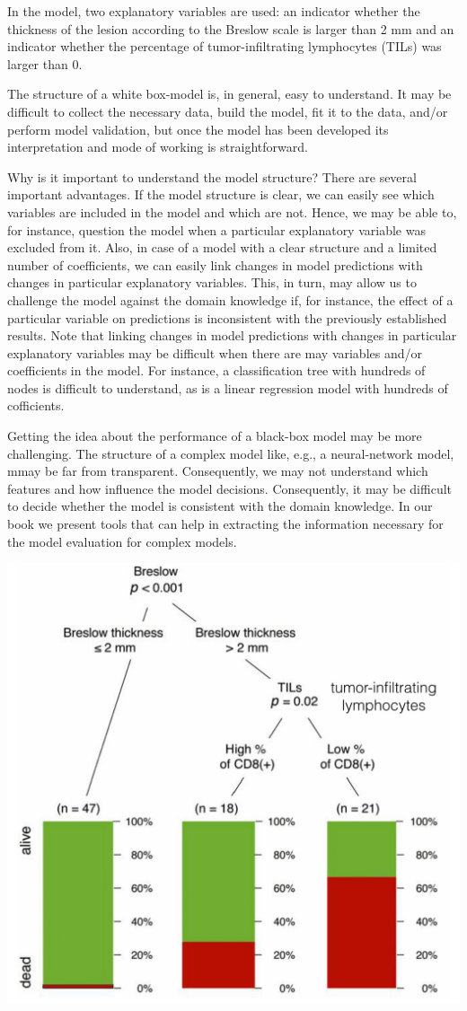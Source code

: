 \documentclass[12pt,]{krantz}
\theoremstyle{definition}
\theoremstyle{definition}
\theoremstyle{definition}
\theoremstyle{remark}
\begin{document}
In the model, two explanatory variables are used: an indicator whether
the thickness of the lesion according to the Breslow scale is larger
than 2 mm and an indicator whether the percentage of tumor-infiltrating
lymphocytes (TILs) was larger than 0.

The structure of a white box-model is, in general, easy to understand.
It may be difficult to collect the necessary data, build the model, fit
it to the data, and/or perform model validation, but once the model has
been developed its interpretation and mode of working is
straightforward.

Why is it important to understand the model structure? There are several
important advantages. If the model structure is clear, we can easily see
which variables are included in the model and which are not. Hence, we
may be able to, for instance, question the model when a particular
explanatory variable was excluded from it. Also, in case of a model with
a clear structure and a limited number of coefficients, we can easily
link changes in model predictions with changes in particular explanatory
variables. This, in turn, may allow us to challenge the model against
the domain knowledge if, for instance, the effect of a particular
variable on predictions is inconsistent with the previously established
results. Note that linking changes in model predictions with changes in
particular explanatory variables may be difficult when there are may
variables and/or coefficients in the model. For instance, a
classification tree with hundreds of nodes is difficult to understand,
as is a linear regression model with hundreds of cofficients.

Getting the idea about the performance of a black-box model may be more
challenging. The structure of a complex model like, e.g., a
neural-network model, mmay be far from transparent. Consequently, we may
not understand which features and how influence the model decisions.
Consequently, it may be difficult to decide whether the model is
consistent with the domain knowledge. In our book we present tools that
can help in extracting the information necessary for the model
evaluation for complex models.

\begin{center}\includegraphics[width=0.5\linewidth]{figure/wbBILL8model} \end{center}
\end{document}
